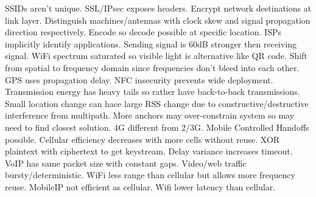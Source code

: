 \documentclass[9pt]{extarticle}
\begin{document}
\begin{multicols}{2}
SSIDs aren't unique. SSL/IPsec exposes headers. Encrypt network destinations at link layer. Distinguish machines/antennas with clock skew and signal propagation direction respectively. Encode so decode possible at specific location. ISPs implicitly identify applications. Sending signal is 60dB stronger then receiving signal. WiFi spectrum saturated so visible light is alternative like QR code. Shift from spatial to frequency domain since frequencies don't bleed into each other. GPS uses propagation delay. NFC insecurity prevents wide deployment. Transmission energy has heavy tails so rather have back-to-back transmissions. Small location change can hace large RSS change due to constructive/destructive interference from multipath. More anchors may over-constrain system so may need to find closest solution. 4G different from 2/3G. Mobile Controlled Handoffs  possible. Cellular efficiency decreases with more cells without reuse. XOR plaintext with ciphertext to get keystream. Delay variance increases timeout. VoIP has same packet size with constant gaps. Video/web traffic bursty/deterministic. WiFi less range than cellular but allows more frequency reuse. MobileIP not efficient as cellular. Wifi lower latency than cellular.

\end{multicols}
\end{document}
